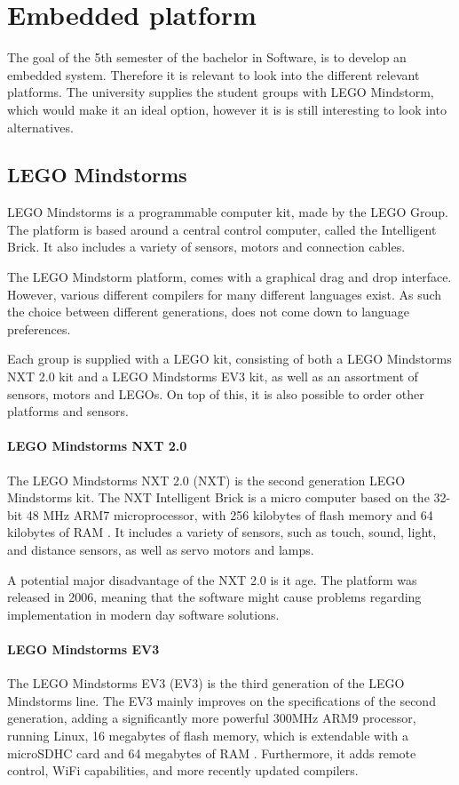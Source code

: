 \section{Embedded platform}
The goal of the 5th semester of the bachelor in Software, is to develop an embedded system.
Therefore it is relevant to look into the different relevant platforms.
The university supplies the student groups with LEGO Mindstorm, which would make it an ideal option, however it is is still interesting to look into alternatives. 

\subsection{LEGO Mindstorms}
LEGO Mindstorms is a programmable computer kit, made by the LEGO Group.
The platform is based around a central control computer, called the Intelligent Brick.
It also includes a variety of sensors, motors and connection cables.

The LEGO Mindstorm platform, comes with a graphical drag and drop interface.
However, various different compilers for many different languages exist.
As such the choice between different generations, does not come down to language preferences.

Each group is supplied with a LEGO kit, consisting of both a LEGO Mindstorms NXT 2.0 kit and a LEGO Mindstorms EV3 kit, as well as an assortment of sensors, motors and LEGOs.
On top of this, it is also possible to order other platforms and sensors.

\paragraph{LEGO Mindstorms NXT 2.0}
The LEGO Mindstorms NXT 2.0 (NXT) is the second generation LEGO Mindstorms kit.
The NXT Intelligent Brick is a micro computer based on the 32-bit 48 MHz ARM7 microprocessor, with 256 kilobytes of flash memory and 64 kilobytes of RAM \cite{nxt2userguide} \cite{nxt2ev3compare}.
It includes a variety of sensors, such as touch, sound, light, and distance sensors, as well as servo motors and lamps.

A potential major disadvantage of the NXT 2.0 is it age. 
The platform was released in 2006, meaning that the software might cause problems regarding implementation in modern day software solutions.

\paragraph{LEGO Mindstorms EV3}
The  LEGO Mindstorms EV3 (EV3) is the third generation of the LEGO Mindstorms line.
The EV3 mainly improves on the specifications of the second generation, adding a significantly more powerful 300MHz ARM9 processor, running Linux, 16 megabytes of flash memory, which is extendable with a microSDHC card and 64 megabytes of RAM \cite{ev3userguide}.
Furthermore, it adds remote control, WiFi capabilities, and more recently updated compilers.

